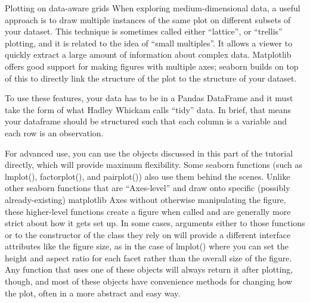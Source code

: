 
Plotting on data-aware grids
When exploring medium-dimensional data, a useful approach is to draw multiple instances of the same plot on different subsets of your dataset. This technique is sometimes called either “lattice”, or “trellis” plotting, and it is related to the idea of “small multiples”. It allows a viewer to quickly extract a large amount of information about complex data. Matplotlib offers good support for making figures with multiple axes; seaborn builds on top of this to directly link the structure of the plot to the structure of your dataset.

To use these features, your data has to be in a Pandas DataFrame and it must take the form of what Hadley Whickam calls “tidy” data. In brief, that means your dataframe should be structured such that each column is a variable and each row is an observation.

For advanced use, you can use the objects discussed in this part of the tutorial directly, which will provide maximum flexibility. Some seaborn functions (such as lmplot(), factorplot(), and pairplot()) also use them behind the scenes. Unlike other seaborn functions that are “Axes-level” and draw onto specific (possibly already-existing) matplotlib Axes without otherwise manipulating the figure, these higher-level functions create a figure when called and are generally more strict about how it gets set up. In some cases, arguments either to those functions or to the constructor of the class they rely on will provide a different interface attributes like the figure size, as in the case of lmplot() where you can set the height and aspect ratio for each facet rather than the overall size of the figure. Any function that uses one of these objects will always return it after plotting, though, and most of these objects have convenience methods for changing how the plot, often in a more abstract and easy way.

